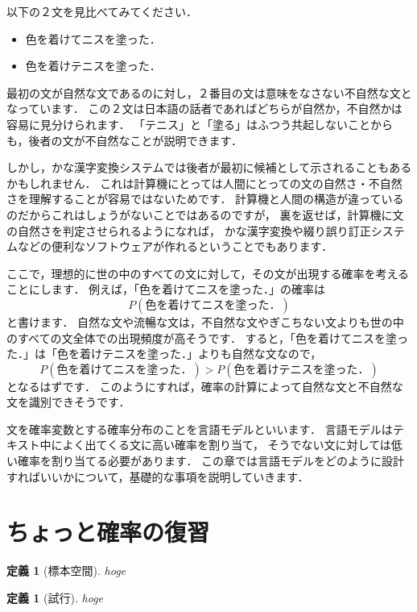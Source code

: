 \documentclass[11pt]{report}
\newtheorem{definition}[theorem]{定義}
\begin{document}
以下の２文を見比べてみてください．
\begin{itemize}
	\item 色を着けてニスを塗った．
	\item 色を着けテニスを塗った．
\end{itemize}
最初の文が自然な文であるのに対し，２番目の文は意味をなさない不自然な文となっています．
この２文は日本語の話者であればどちらが自然か，不自然かは容易に見分けられます．
「テニス」と「塗る」はふつう共起しないことからも，後者の文が不自然なことが説明できます．

しかし，かな漢字変換システムでは後者が最初に候補として示されることもあるかもしれません．
これは計算機にとっては人間にとっての文の自然さ・不自然さを理解することが容易ではないためです．
計算機と人間の構造が違っているのだからこれはしょうがないことではあるのですが，
裏を返せば，計算機に文の自然さを判定させられるようになれば，
かな漢字変換や綴り誤り訂正システムなどの便利なソフトウェアが作れるということでもあります．

ここで，理想的に世の中のすべての文に対して，その文が出現する確率を考えることにします．
例えば，「色を着けてニスを塗った．」の確率は
\begin{equation*}
	P(\mathrm{色を着けてニスを塗った．})
\end{equation*}
と書けます．
自然な文や流暢な文は，不自然な文やぎこちない文よりも世の中のすべての文全体での出現頻度が高そうです．
すると，「色を着けてニスを塗った．」は「色を着けテニスを塗った．」よりも自然な文なので，
\begin{equation*}
	P(\mathrm{色を着けてニスを塗った．})
	>
	P(\mathrm{色を着けテニスを塗った．})
\end{equation*}
となるはずです．
このようにすれば，確率の計算によって自然な文と不自然な文を識別できそうです．

文を確率変数とする確率分布のことを言語モデルといいます．
言語モデルはテキスト中によく出てくる文に高い確率を割り当て，
そうでない文に対しては低い確率を割り当てる必要があります．
この章では言語モデルをどのように設計すればいいかについて，基礎的な事項を説明していきます．

\section{ちょっと確率の復習}

\begin{definition}[標本空間]
	hoge
\end{definition}

\begin{definition}[試行]
	hoge
\end{definition}
\end{document}
